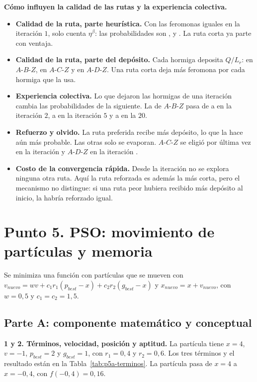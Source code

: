 \documentclass[12pt,a4paper]{article}
\begin{document}
\textbf{Cómo influyen la calidad de las rutas y la experiencia colectiva.}
\begin{itemize}
  \item \textbf{Calidad de la ruta, parte heurística.} Con las feromonas
  iguales en la iteración $1$, solo cuenta $\eta^\beta$: las probabilidades
  son \PcuatroBIni{}, \PcuatroCIni{} y \PcuatroDIni{}. La ruta corta ya parte
  con ventaja.
  \item \textbf{Calidad de la ruta, parte del depósito.} Cada hormiga
  deposita $Q/L_r$: \PcuatroBDep{} en $A$-$B$-$Z$, \PcuatroCDep{} en
  $A$-$C$-$Z$ y \PcuatroDDep{} en $A$-$D$-$Z$. Una ruta corta deja más
  feromona por cada hormiga que la usa.
  \item \textbf{Experiencia colectiva.} Lo que dejaron las hormigas de una
  iteración cambia las probabilidades de la siguiente. La de $A$-$B$-$Z$
  pasa de \PcuatroBIni{} a \PcuatroBDos{} en la iteración $2$, a
  \PcuatroBCinco{} en la iteración $5$ y a \PcuatroBFin{} en la $20$.
  \item \textbf{Refuerzo y olvido.} La ruta preferida recibe más depósito,
  lo que la hace aún más probable. Las otras solo se evaporan. $A$-$C$-$Z$
  se eligió por última vez en la iteración \PcuatroUltimaC{} y $A$-$D$-$Z$ en
  la iteración \PcuatroUltimaD{}.
  \item \textbf{Costo de la convergencia rápida.} Desde la iteración
  \PcuatroIterTodas{} no se explora ninguna otra ruta. Aquí la ruta
  reforzada es además la más corta, pero el mecanismo no distingue: si una
  ruta peor hubiera recibido más depósito al inicio, la habría reforzado igual.
\end{itemize}

\section{Punto 5. PSO: movimiento de partículas y memoria}

Se minimiza una función con partículas que se mueven con
$v_{nuevo}=wv+c_1r_1(p_{best}-x)+c_2r_2(g_{best}-x)$ y
$x_{nuevo}=x+v_{nuevo}$, con $w=0{,}5$ y $c_1=c_2=1{,}5$.

\subsection{Parte A: componente matemático y conceptual}

\noindent\textbf{1 y 2. Términos, velocidad, posición y aptitud.} La
partícula tiene $x=4$, $v=-1$, $p_{best}=2$ y $g_{best}=1$, con
$r_1=0{,}4$ y $r_2=0{,}6$. Los tres términos y el resultado están en la
Tabla~\ref{tab:p5a-terminos}. La partícula pasa de $x=4$ a $x=-0{,}4$, con
$f(-0{,}4)=0{,}16$.
\end{document}
